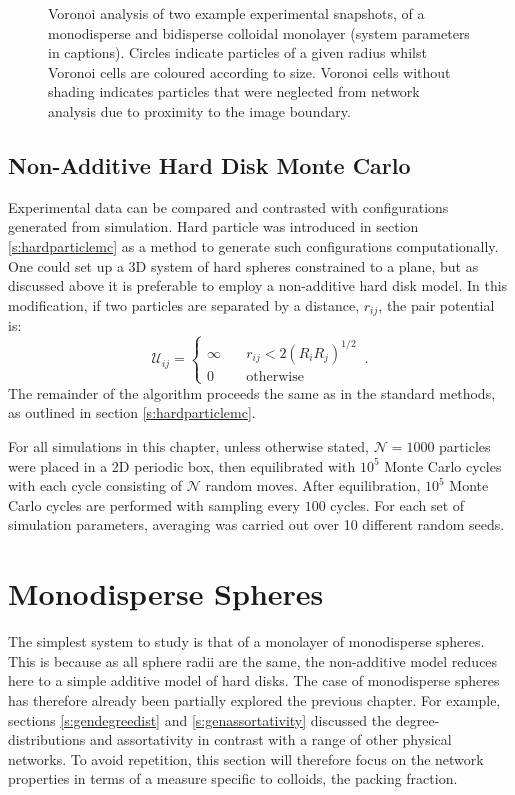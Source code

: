 \begin{figure}[bt]
     \caption{Voronoi analysis of two example experimental snapshots, of a monodisperse and bidisperse \qtd{} colloidal monolayer (system parameters in captions). Circles indicate particles of a given radius whilst Voronoi cells are coloured according to size. Voronoi cells without shading indicates particles that were neglected from network analysis due to proximity to the image boundary.}
     \label{fig:expvoro}
\end{figure}

\subsection{Non\--Additive Hard Disk Monte Carlo}
\label{s:nonaddmc}

Experimental data can be compared and contrasted with configurations generated from simulation.
Hard particle \mc{} was introduced in section \ref{s:hardparticlemc} as a method to generate such configurations computationally.
One could set up a 3D system of hard spheres constrained to a plane, but as discussed above it is preferable to employ a non\--additive hard disk model.
In this modification, if two particles are separated by a distance, $r_{ij}$, the pair potential is:
\begin{equation}
	\mathcal{U}_{ij} = \begin{cases} \infty \quad &r_{ij}<2\left(R_iR_j\right)^{1/2} \\ 0 \quad &\text{otherwise} \end{cases}\,.
\end{equation}
The remainder of the algorithm proceeds the same as in the standard methods, as outlined in section \ref{s:hardparticlemc}.

For all simulations in this chapter, unless otherwise stated, $\mathcal{N}=1000$ particles were placed in a 2D periodic box, then equilibrated with $10^5$ Monte Carlo cycles with each cycle consisting of $\mathcal{N}$ random moves.
After equilibration, $10^5$ Monte Carlo cycles are performed with sampling every $100$ cycles.
For each set of simulation parameters, averaging was carried out over 10 different random seeds.


\section{Monodisperse Spheres}
\label{s:monodisperse}

The simplest \qtd{} system to study is that of a monolayer of monodisperse spheres.
This is because as all sphere radii are the same, the non\--additive model reduces here to a simple additive model of hard disks.
The case of monodisperse spheres has therefore already been partially explored the previous chapter.
For example, sections \ref{s:gendegreedist} and \ref{s:genassortativity} discussed the degree\--distributions and assortativity in contrast with a range of other physical networks.
To avoid repetition, this section will therefore focus on the network properties in terms of a measure specific to colloids, the packing fraction.


